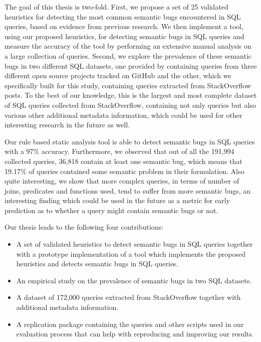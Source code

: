 The goal of this thesis is two-fold. First, we propose a set of 25 validated heuristics for detecting the most common semantic bugs encountered in SQL queries, based on evidence from previous research. We then implement a tool, using our proposed heuristics, for detecting semantic bugs in SQL queries and measure the accuracy of the tool by performing an extensive manual analysis on a large collection of queries. Second, we explore the prevalence of these semantic bugs in two different SQL datasets, one provided by \citet{P011} containing queries from three different open source projects tracked on GitHub and the other, which we specifically built for this study, containing queries extracted from StackOverflow posts. To the best of our knowledge, this is the largest and most complete dataset of SQL queries collected from StackOverflow, containing not only queries but also various other additional metadata information, which could be used for other interesting research in the future as well.

Our rule based static analysis tool is able to detect semantic bugs in SQL queries with a 97\% accuracy. Furthermore, we observed that out of all the 191,994 collected queries, 36,818 contain at least one semantic bug, which means that 19.17\% of queries contained some semantic problem in their formulation. Also quite interesting, we show that more complex queries, in terms of number of joins, predicates and functions used, tend to suffer from more semantic bugs, an interesting finding which could be used in the future as a metric for early prediction as to whether a query might contain semantic bugs or not.

Our thesis leads to the following four contributions:
\begin{itemize}
    \item A set of validated heuristics to detect semantic bugs in SQL queries together with a prototype implementation of a tool which implements the proposed heuristics and detects semantic bugs in SQL queries.
    \item An empirical study on the prevalence of semantic bugs in two SQL datasets.
    \item A dataset of 172,000 queries extracted from StackOverflow together with additional metadata information.
    \item A replication package containing the queries and other scripts used in our evaluation process that can help with reproducing and improving our results.
\end{itemize}